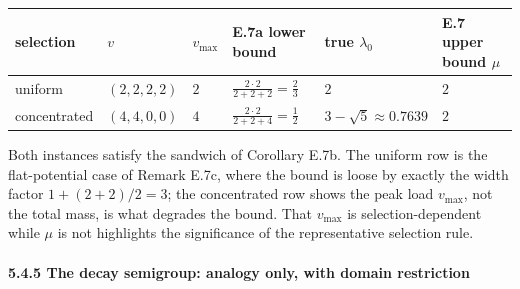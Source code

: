 \documentclass[
]{article}
\begin{document}
\begin{longtable}[]{@{}
  >{\raggedright\arraybackslash}p{}
  >{\raggedright\arraybackslash}p{}
  >{\raggedright\arraybackslash}p{}
  >{\raggedright\arraybackslash}p{}
  >{\raggedright\arraybackslash}p{}
  >{\raggedright\arraybackslash}p{}@{}}
\toprule\noalign{}
\begin{minipage}[b]{\linewidth}\raggedright
selection
\end{minipage} & \begin{minipage}[b]{\linewidth}\raggedright
\(v\)
\end{minipage} & \begin{minipage}[b]{\linewidth}\raggedright
\(v_{\max}\)
\end{minipage} & \begin{minipage}[b]{\linewidth}\raggedright
E.7a lower bound
\end{minipage} & \begin{minipage}[b]{\linewidth}\raggedright
true \(\lambda_0\)
\end{minipage} & \begin{minipage}[b]{\linewidth}\raggedright
E.7 upper bound \(\mu\)
\end{minipage} \\
\midrule\noalign{}
\endhead
\bottomrule\noalign{}
\endlastfoot
uniform & \((2,2,2,2)\) & \(2\) & \(\tfrac{2\cdot 2}{2+2+2} = \tfrac23\) & \(2\) & \(2\) \\
concentrated & \((4,4,0,0)\) & \(4\) & \(\tfrac{2\cdot 2}{2+2+4} = \tfrac12\) & \(3-\sqrt5 \approx 0.7639\) & \(2\) \\
\end{longtable}

Both instances satisfy the sandwich of Corollary E.7b. The uniform row is the flat-potential case of Remark E.7c, where the bound is loose by exactly the width factor \(1 + (2+2)/2 = 3\); the concentrated row shows the peak load \(v_{\max}\), not the total mass, is what degrades the bound. That \(v_{\max}\) is selection-dependent while \(\mu\) is not highlights the significance of the representative selection rule.

\paragraph{5.4.5 The decay semigroup: analogy only, with domain restriction}\label{the-decay-semigroup-analogy-only-with-domain-restriction}
\end{document}
